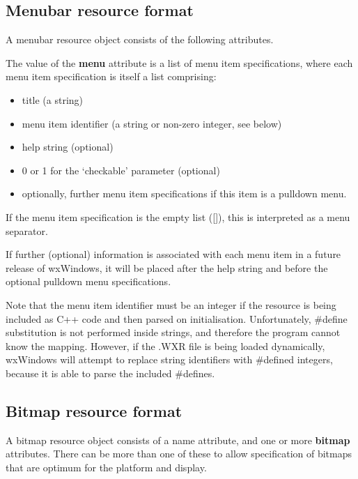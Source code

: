 \subsection{Menubar resource format}

A menubar resource object consists of the following attributes.

\begin{twocollist}\itemsep=0pt
\end{twocollist}

The value of the {\bf menu} attribute is a list of menu item specifications, where each menu
item specification is itself a list comprising:

\begin{itemize}\itemsep=0pt
\item title (a string)
\item menu item identifier (a string or non-zero integer, see below)
\item help string (optional)
\item 0 or 1 for the `checkable' parameter (optional)
\item optionally, further menu item specifications if this item is a pulldown menu.
\end{itemize}

If the menu item specification is the empty list ([]), this is interpreted as a menu separator.

If further (optional) information is associated with each menu item in a future release of wxWindows,
it will be placed after the help string and before the optional pulldown menu specifications.

Note that the menu item identifier must be an integer if the resource is being
included as C++ code and then parsed on initialisation. Unfortunately,\rtfsp
\#define substitution is not performed inside strings, and
therefore the program cannot know the mapping. However, if the .WXR file
is being loaded dynamically, wxWindows will attempt to replace string
identifiers with \#defined integers, because it is able to parse
the included \#defines.

\subsection{Bitmap resource format}

A bitmap resource object consists of a name attribute, and one or more {\bf bitmap} attributes.
There can be more than one of these to allow specification of bitmaps that are optimum for the
platform and display.

